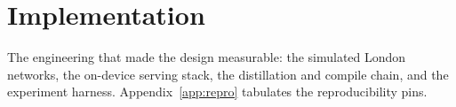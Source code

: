 \section{Implementation}\label{ch:implementation}

The engineering that made the design measurable: the simulated London
networks, the on-device serving stack, the distillation and compile chain,
and the experiment harness. Appendix~\ref{app:repro} tabulates the
reproducibility pins.






